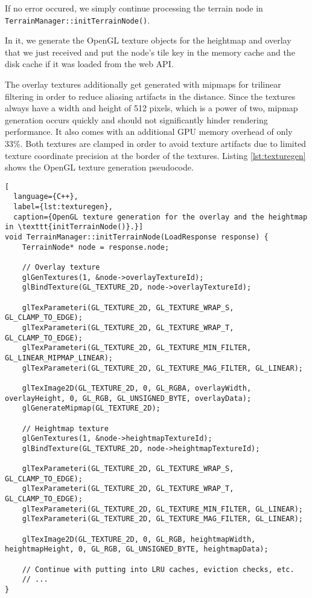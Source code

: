 If no error occured, we simply continue processing the terrain node 
in \texttt{TerrainManager::initTerrainNode()}.

In it, we generate the OpenGL texture objects for 
the heightmap and overlay that we just received
and put the node's tile key in the memory cache
and the disk cache if it was loaded from the web API.

The overlay textures additionally get generated with mipmaps for 
trilinear filtering in order to reduce aliasing artifacts in the distance.
Since the textures always have a width and height of 512 pixels, which is a power of two,
mipmap generation occurs quickly and should not significantly hinder rendering performance.
It also comes with an additional GPU memory overhead of only 33\%.
Both textures are clamped in order to avoid
texture artifacts due to limited texture coordinate precision 
at the border of the textures.
Listing \ref{lst:texturegen} shows the OpenGL texture generation pseudocode.

\begin{lstlisting}[
  language={C++},
  label={lst:texturegen},
  caption={OpenGL texture generation for the overlay and the heightmap in \texttt{initTerrainNode()}.}]
void TerrainManager::initTerrainNode(LoadResponse response) {
    TerrainNode* node = response.node;

    // Overlay texture
    glGenTextures(1, &node->overlayTextureId);
    glBindTexture(GL_TEXTURE_2D, node->overlayTextureId);

    glTexParameteri(GL_TEXTURE_2D, GL_TEXTURE_WRAP_S, GL_CLAMP_TO_EDGE);
    glTexParameteri(GL_TEXTURE_2D, GL_TEXTURE_WRAP_T, GL_CLAMP_TO_EDGE);
    glTexParameteri(GL_TEXTURE_2D, GL_TEXTURE_MIN_FILTER, GL_LINEAR_MIPMAP_LINEAR);
    glTexParameteri(GL_TEXTURE_2D, GL_TEXTURE_MAG_FILTER, GL_LINEAR);

    glTexImage2D(GL_TEXTURE_2D, 0, GL_RGBA, overlayWidth, overlayHeight, 0, GL_RGB, GL_UNSIGNED_BYTE, overlayData);
    glGenerateMipmap(GL_TEXTURE_2D);

    // Heightmap texture
    glGenTextures(1, &node->heightmapTextureId);
    glBindTexture(GL_TEXTURE_2D, node->heightmapTextureId);

    glTexParameteri(GL_TEXTURE_2D, GL_TEXTURE_WRAP_S, GL_CLAMP_TO_EDGE);
    glTexParameteri(GL_TEXTURE_2D, GL_TEXTURE_WRAP_T, GL_CLAMP_TO_EDGE);
    glTexParameteri(GL_TEXTURE_2D, GL_TEXTURE_MIN_FILTER, GL_LINEAR);
    glTexParameteri(GL_TEXTURE_2D, GL_TEXTURE_MAG_FILTER, GL_LINEAR);

    glTexImage2D(GL_TEXTURE_2D, 0, GL_RGB, heightmapWidth, heightmapHeight, 0, GL_RGB, GL_UNSIGNED_BYTE, heightmapData);

    // Continue with putting into LRU caches, eviction checks, etc.
    // ...
}
\end{lstlisting}

